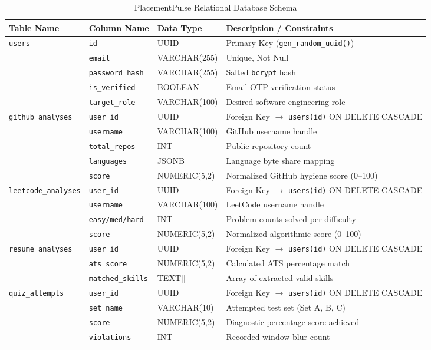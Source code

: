 \documentclass[12pt,a4paper]{report}
\begin{document}
\begin{table}[htbp]
\centering
\scriptsize
\caption{PlacementPulse Relational Database Schema}
\label{tab:database_schema}
\begin{tabularx}{\textwidth}{l l l X}
\toprule
\textbf{Table Name} & \textbf{Column Name} & \textbf{Data Type} & \textbf{Description / Constraints} \\
\midrule
\texttt{users} & \texttt{id} & UUID & Primary Key (\texttt{gen\_random\_uuid()}) \\
& \texttt{email} & VARCHAR(255) & Unique, Not Null \\
& \texttt{password\_hash} & VARCHAR(255) & Salted \texttt{bcrypt} hash \\
& \texttt{is\_verified} & BOOLEAN & Email OTP verification status \\
& \texttt{target\_role} & VARCHAR(100) & Desired software engineering role \\
\addlinespace
\texttt{github\_analyses} & \texttt{user\_id} & UUID & Foreign Key $\rightarrow$ \texttt{users(id)} ON DELETE CASCADE \\
& \texttt{username} & VARCHAR(100) & GitHub username handle \\
& \texttt{total\_repos} & INT & Public repository count \\
& \texttt{languages} & JSONB & Language byte share mapping \\
& \texttt{score} & NUMERIC(5,2) & Normalized GitHub hygiene score (0--100) \\
\addlinespace
\texttt{leetcode\_analyses} & \texttt{user\_id} & UUID & Foreign Key $\rightarrow$ \texttt{users(id)} ON DELETE CASCADE \\
& \texttt{username} & VARCHAR(100) & LeetCode username handle \\
& \texttt{easy/med/hard} & INT & Problem counts solved per difficulty \\
& \texttt{score} & NUMERIC(5,2) & Normalized algorithmic score (0--100) \\
\addlinespace
\texttt{resume\_analyses} & \texttt{user\_id} & UUID & Foreign Key $\rightarrow$ \texttt{users(id)} ON DELETE CASCADE \\
& \texttt{ats\_score} & NUMERIC(5,2) & Calculated ATS percentage match \\
& \texttt{matched\_skills} & TEXT[] & Array of extracted valid skills \\
\addlinespace
\texttt{quiz\_attempts} & \texttt{user\_id} & UUID & Foreign Key $\rightarrow$ \texttt{users(id)} ON DELETE CASCADE \\
& \texttt{set\_name} & VARCHAR(10) & Attempted test set (Set A, B, C) \\
& \texttt{score} & NUMERIC(5,2) & Diagnostic percentage score achieved \\
& \texttt{violations} & INT & Recorded window blur count \\
\bottomrule
\end{tabularx}
\end{table}
\end{document}
